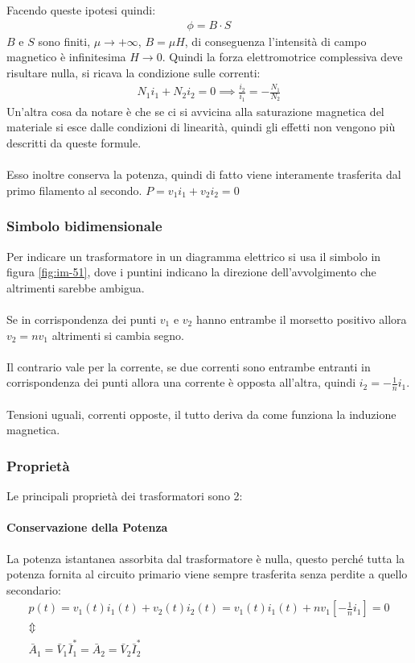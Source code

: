\documentclass[../main.tex]{subfiles}
\begin{document}
	Facendo queste ipotesi quindi:
	\begin{gather}
		\phi= B\cdot S
	\end{gather}
	$B$ e $S$ sono finiti, $\mu\rightarrow +\infty$, $B=\mu H$, di conseguenza l'intensità di campo magnetico è infinitesima $H\rightarrow 0$. Quindi la forza elettromotrice complessiva deve risultare nulla, si ricava la condizione sulle correnti:
	\begin{gather}
		N_1i_1+N_2i_2=0 \implies \frac{i_2}{i_1}=-\frac{N_1}{N_2}
	\end{gather}
	Un'altra cosa da notare è che se ci si avvicina alla saturazione magnetica del materiale si esce dalle condizioni di linearità, quindi gli effetti non vengono più descritti da queste formule.\\\\
	Esso inoltre conserva la potenza, quindi di fatto viene interamente trasferita dal primo filamento al secondo. $P=v_1i_1+v_2i_2=0$
	\subsubsection{Simbolo bidimensionale}
	Per indicare un trasformatore in un diagramma elettrico si usa il simbolo in figura \ref{fig:im-51}, dove i puntini indicano la direzione dell'avvolgimento che altrimenti sarebbe ambigua.\\\\
	Se in corrispondenza dei punti $v_1$ e $v_2$ hanno entrambe il morsetto positivo allora $v_2=nv_1$ altrimenti si cambia segno.\\\\
	Il contrario vale per la corrente, se due correnti sono entrambe entranti in corrispondenza dei punti allora una corrente è opposta all'altra, quindi $i_2=-\frac{1}{n}i_1$.\\\\
	Tensioni uguali, correnti opposte, il tutto deriva da come funziona la induzione magnetica.
	\subsubsection{Proprietà}
	Le principali proprietà dei trasformatori sono 2:
	\paragraph{Conservazione della Potenza}
	La potenza istantanea assorbita dal trasformatore è nulla, questo perché tutta la potenza fornita al circuito primario viene sempre trasferita senza perdite a quello secondario:
	\begin{gather}
		p(t) = v_1(t)i_1(t) + v_2(t)i_2(t) = v_1(t)i_1(t) + n v_1 \left[ -\frac{1}{n} i_1 \right] = 0 \\
		\Updownarrow \\
		\bar{A}_1 = \bar{V}_1 \bar{I}_1^* = \bar{A}_2 = \bar{V}_2 \bar{I}_2^*
	\end{gather}
\end{document}
